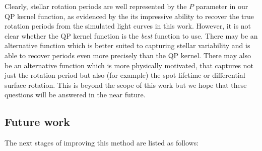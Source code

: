 \documentclass[useAMS, usenatbib, preprint, 12pt]{aastex}
\begin{document}
Clearly, stellar rotation periods are well represented by the $P$ parameter in
our QP kernel function, as evidenced by the its impressive ability to recover
the true rotation periods from the simulated light curves in this work.
However, it is not clear whether the QP kernel function is the {\it best}
function to use.
There may be an alternative function which is better suited to capturing
stellar variability and is able to recover periods even more precisely than
the QP kernel.
There may also be an alternative function which is more physically motivated,
that captures not just the rotation period but also (for example) the spot
lifetime or differential surface rotation.
This is beyond the scope of this work but we hope that these questions will be
answered in the near future.

\subsection{Future work}
The next stages of improving this method are listed as follows:
\end{document}
